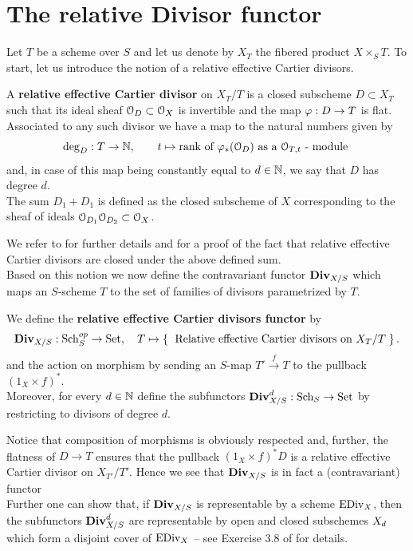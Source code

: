 \section{The relative Divisor functor}\label{sec:Div_functor}
	Let $T$ be a scheme over $S$ and let us denote by $X_T$ the fibered product $X\times_S T$. To start, let us introduce the notion of a relative effective Cartier divisors.
	\begin{defi}
		A \textbf{relative effective Cartier divisor} on $X_T/T$ is a closed subscheme $D\subset X_T$ such that its ideal sheaf $\mathcal{O}_D\subset \mathcal{O}_X$ is invertible and the map $\varphi: D\to T$ is flat.\\
		Associated to any such divisor we have a map to the natural numbers given by
		$$ \deg_D : T \to \mathbb{N}, \qquad t \mapsto \text{rank of } \varphi_*(\mathcal{O}_D) \text{ as a } \mathcal{O}_{T,t} \text{ - module } $$
		and, in case of this map being constantly equal to $d\in \mathbb{N}$, we say that $D$ has degree $d$.\\
		The sum $D_1 + D_1$ is defined as the closed subscheme of $X$ corresponding to the sheaf of ideals $\mathcal{O}_{D_1}\mathcal{O}_{D_2}\subset \mathcal{O}_X$.
	\end{defi}
	We refer to \cite[Tag 01WO]{stacks-project} for further details and for a proof of the fact that relative effective Cartier divisors are closed under the above defined sum.\\
	Based on this notion we now define the contravariant functor $\operatorname{\mathbf{Div}}_{X/S}$ which maps an $S$-scheme $T$ to the set of families of divisors parametrized by $T$.
	\begin{defi}
		We define the \textbf{relative effective Cartier divisors functor} by
		$$ \operatorname{\mathbf{Div}}_{X/S}:\operatorname{Sch}_S^{op} \to \operatorname{Set}, \quad T \mapsto \left\{\;  \text{ Relative effective Cartier divisors} \text{ on } X_T/T  \; \right\}. $$
		and the action on morphism by sending an $S$-map $T'\overset{f}\to T$ to the pullback $(1_X\times f)^*$.\\ 
		Moreover, for every $d\in \mathbb{N}$ define the subfunctors $\operatorname{\mathbf{Div}}_{X/S}^d:\operatorname{Sch}_S \to \operatorname{Set}$ by restricting to divisors of degree $d$.
	\end{defi}
	\begin{rema}
		Notice that composition of morphisms is obviously respected and, further, the flatness of $D\to T$ ensures that the pullback $(1_X\times f)^*D$ is a relative effective Cartier divisor on $X_{T'}/T'$. Hence we see that $\operatorname{\mathbf{Div}}_{X/S}$ is in fact a (contravariant) functor \\
		Further one can show that, if $\operatorname{\mathbf{Div}}_{X/S}$ is representable by a scheme $\operatorname{EDiv}_X$, then the subfunctors $\operatorname{\mathbf{Div}}_{X/S}^d$ are representable by open and closed subschemes $X_d$ which form a disjoint cover of $\operatorname{EDiv}_X$ -- see Exercise 3.8 of \cite{PICARD} for details.
	\end{rema}
